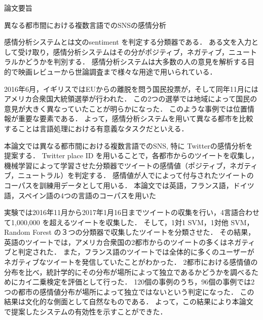 \thispagestyle{empty}
\vspace*{2.0cm}

\begin{center}
\LARGE{論文要旨}
\end{center}
\vspace*{3mm}

\begin{center}
\LARGE{異なる都市間における複数言語でのSNSの感情分析}
\end{center}

\vspace{20mm}
\setlength\parindent{2zw}

感情分析システムとは文のsentiment を判定する分類器である．
ある文を入力として受け取り，感情分析システムはその分がポジティブ，ネガティブ，ニュートラルかどうかを判別する．
感情分析システムは大多数の人の意見を解析する目的で映画レビューから世論調査まで様々な用途で用いられている．

2016年6月，イギリスではEUからの離脱を問う国民投票が，そして同年11月にはアメリカ合衆国大統領選挙が行われた．
この2つの選挙では地域によって国民の意見が大きく異なっていたことが明らかになった．
このような事例では位置情報が重要な要素である．
よって，感情分析システムを用いて異なる都市を比較することは言語処理における有意義なタスクだといえる．

本論文では異なる都市間における複数言語でのSNS, 特に Twitterの感情分析を提案する．
Twitter place ID を用いることで，各都市からのツイートを収集し，機械学習によって学習させた分類器でツイートの感情値（ポジティブ，ネガティブ，ニュートラル）を判定する．
感情値が人でによって付与されたツイートのコーパスを訓練用データとして用いる．
本論文では英語，フランス語，ドイツ語，スペイン語の4つの言語のコーパスを用いた

実験では2016年11月から2017年1月16日までツイートの収集を行い，4言語合わせて1,000,000 を超えるツイートを収集した．
そして，1対1 SVM，1対他 SVM，Random Forest の３つの分類器で収集したツイートを分類させた．
その結果，英語のツイートでは，アメリカ合衆国の2都市からのツイートの多くはネガティブと判定された．
また，フランス語のツイートでは全体的に多くのユーザーがネガティブなツイートを発信していたことがわかった．
2都市における感情値の分布を比べ，統計学的にその分布が場所によって独立であるかどうかを調べるためにカイ二乗検定を評価として行った．
120個の事例のうち，96個の事例では2つの都市の感情値分布が場所によって独立ではないという判定になった．
この結果は文化的な側面として自然なものである．
よって，この結果により本論文で提案したシステムの有効性を示すことができた．


